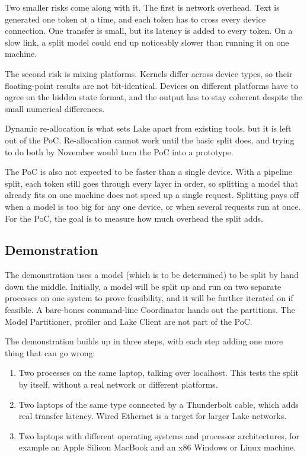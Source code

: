 \documentclass{article}
\begin{document}
Two smaller risks come along with it. The first is network overhead. Text is
generated one token at a time, and each token has to cross every device connection.
One transfer is small, but its latency is added to every token. On a slow link, a split
model could end up noticeably slower than running it on one machine. 

The second risk is mixing platforms. Kernels differ across device types, so
their floating-point results are not bit-identical. Devices on different
platforms have to agree on the hidden state format, and the output has to stay
coherent despite the small numerical differences.

Dynamic re-allocation is what sets Lake apart from existing tools, but it is
left out of the PoC. Re-allocation cannot work until the basic split does, and
trying to do both by November would turn the PoC into a prototype.

The PoC is also not expected to be faster than a single device. With a
pipeline split, each token still goes through every layer in order, so
splitting a model that already fits on one machine does not speed up a single
request. Splitting pays off when a model is too big for any one device, or
when several requests run at once. For the PoC, the goal is to measure how
much overhead the split adds.

\subsection{Demonstration}

The demonstration uses a model (which is to be determined) to be split by hand down the middle. Initially, a model will be split up and run on two separate processes on one system to prove feasibility, and it will be further iterated on if feasible. A bare-bones
command-line Coordinator hands out the partitions. The Model Partitioner, profiler
and Lake Client are not part of the PoC.

The demonstration builds up in three steps, with each step adding one more
thing that can go wrong:

\begin{enumerate}
  \item Two processes on the same laptop, talking over localhost. This tests
    the split by itself, without a real network or different platforms.
  \item Two laptops of the same type connected by a Thunderbolt cable, which
    adds real transfer latency. Wired Ethernet is a target for larger
    Lake networks.
  \item Two laptops with different operating systems and processor
    architectures, for example an Apple Silicon MacBook and an x86 Windows or
    Linux machine.
\end{enumerate}
\end{document}
